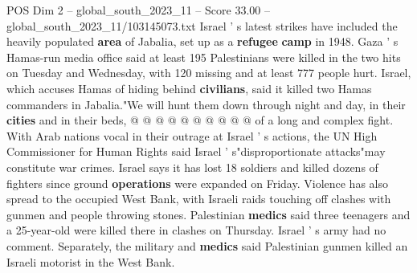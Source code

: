 \begin{textsample}{POS Dim 2 – global\_south\_2023\_11 – Score 33.00 – global\_south\_2023\_11/103145073.txt}
Israel ' s latest strikes have included the heavily populated \textbf{area} of Jabalia, set up as a \textbf{refugee} \textbf{camp} in 1948.
Gaza ' s Hamas-run media office said at least 195 Palestinians were killed in the two hits on Tuesday and Wednesday, with 120 missing and at least 777 people hurt.
Israel, which accuses Hamas of hiding behind \textbf{civilians}, said it killed two Hamas commanders in Jabalia."We will hunt them down through night and day, in their \textbf{cities} and in their beds, @ @ @ @ @ @ @ @ @ @ of a long and complex fight.
With Arab nations vocal in their outrage at Israel ' s actions, the UN High Commissioner for Human Rights said Israel ' s"disproportionate attacks"may constitute war crimes.
Israel says it has lost 18 soldiers and killed dozens of fighters since ground \textbf{operations} were expanded on Friday.
Violence has also spread to the occupied West Bank, with Israeli raids touching off clashes with gunmen and people throwing stones.
Palestinian \textbf{medics} said three teenagers and a 25-year-old were killed there in clashes on Thursday.
Israel ' s army had no comment.
Separately, the military and \textbf{medics} said Palestinian gunmen killed an Israeli motorist in the West Bank.

\end{textsample}
